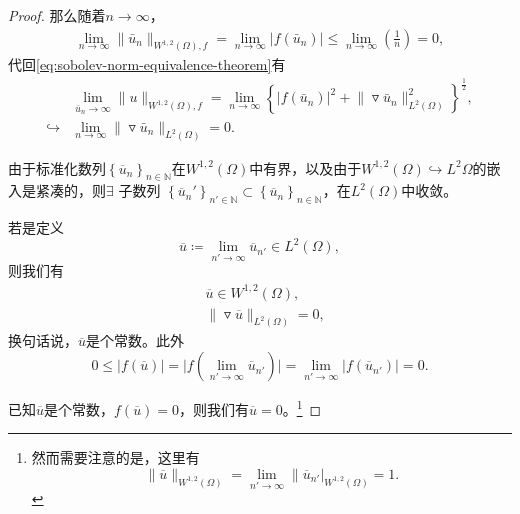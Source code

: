 \begin{proof}
那么随着$n \rightarrow \infty$，
\begin{equation*}
  \begin{split}
    \lim_{n \rightarrow \infty} \big\| \bar{u}_n \big\|_{W^{1,2}(\Omega), f} = \lim_{n \rightarrow \infty} \big| f(\bar{u}_n) \big| \le \lim_{n \rightarrow \infty} \left( \frac{1}{n} \right) =0,
  \end{split}
\end{equation*}
代回\eqref{eq:sobolev-norm-equivalence-theorem}有
\begin{equation*}
\begin{split}
  &\lim _{\bar{u}_n \rightarrow \infty} \big\| u \big\|_{W^{1,2}(\Omega), f} = \lim_{n \rightarrow \infty} \left\{ \left| f(\bar{u}_n) \right|^2 + \big\| \triangledown \bar{u}_n \big\|_{L^{2}(\Omega)}^2 \right\}^{\frac{1}{2}} ,\\
  \hookrightarrow & \lim_{n \rightarrow \infty} \big\| \triangledown \bar{u}_n \big\|_{L^2(\Omega)}=0.
\end{split}
\end{equation*}

由于标准化数列$\left\{ \overline{u}_n \right\}_{n \in \mathbb{N}}$在$W^{1,2}(\Omega)$中有界，以及由于$W^{1,2}(\Omega) \hookrightarrow L^2{\Omega}$的嵌入是紧凑的，则$\exists$ 子数列 $\left\{ \overline{u}_n' \right\}_{n' \in \mathbb{N}}  \subset \left\{ \overline{u}_n \right\}_{n \in \mathbb{N}} $，在$L^2(\Omega)$中收敛。

若是定义
\begin{equation*}
  \overline{u} \coloneqq \lim_{n' \rightarrow \infty}\overline{u}_{n'} \in L^{2}(\Omega),
\end{equation*}
则我们有
\begin{equation*}
  \begin{split}
    & \overline{u} \in W^{1,2}(\Omega), \\
    & \big\| \triangledown \overline{u} \big\|_{L^2(\Omega)} = 0,
  \end{split}
\end{equation*}
换句话说，$\overline{u}$是个常数。此外
\begin{equation*}
  0 \le \big| f(\overline{u}) \big| = \big| f \left( \lim_{n' \rightarrow \infty}  \overline{u}_{n'} \right) \big| =  \lim_{n' \rightarrow \infty} \big| f(\overline{u}_{n'})\big| = 0.
\end{equation*}

已知$\overline{u}$是个常数，$f(\overline{u}) = 0$，则我们有$\overline{u}=0$。\footnote{然而需要注意的是，这里有
\begin{equation*}
\big\|  \overline{u} \big\|_{W^{1,2}(\Omega)} = \lim_{n' \rightarrow \infty} \big\| \overline{u}_{n'} \big|_{W^{1,2}(\Omega)} = 1.
\end{equation*}}


\end{proof}
